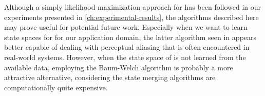Although a simply likelihood maximization approach for  has been followed in our experiments presented in \autoref{ch:experimental-results}, the algorithms described here may prove useful for potential future work.
Especially when we want to learn state spaces for  for our application domain, the latter algorithm seen in \cite{nikovski1999learning} appears better capable of dealing with perceptual aliasing that is often encountered in real-world systems.
However, when the state space of  is not learned from the available data, employing the Baum-Welch algorithm is probably a more attractive alternative, considering the state merging algorithms are computationally quite expensive.


%
%


%
%

%
%

